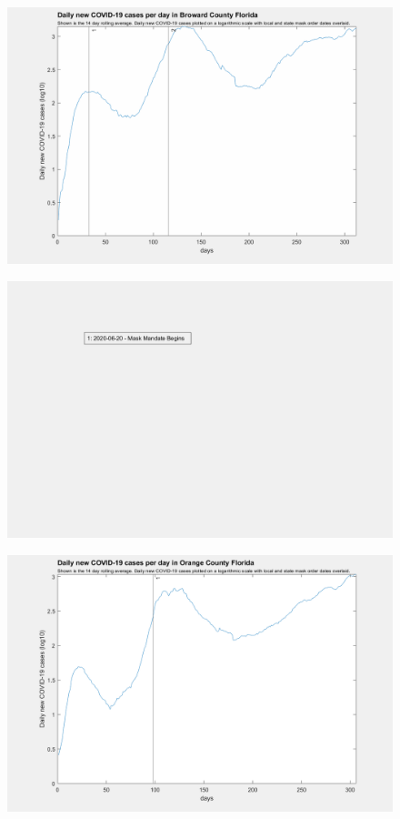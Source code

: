 \documentclass[]{article}
\begin{document}
\begin{figure}[!h]
	\includegraphics[width=\linewidth]{images/broward_mask_order_log.png}
	\caption{}
	\label{fig:images/broward_mask_order_logLabel}
\end{figure}

\begin{figure}[!h]
	\includegraphics[width=\linewidth]{legends/orange_mask_order_legend.png}
	\caption{}
	\label{fig:legends/orange_mask_order_legendLabel}
\end{figure}

\begin{figure}[!h]
	\includegraphics[width=\linewidth]{images/orange_mask_order_log.png}
	\caption{}
	\label{fig:images/orange_mask_order_logLabel}
\end{figure}
\end{document}
